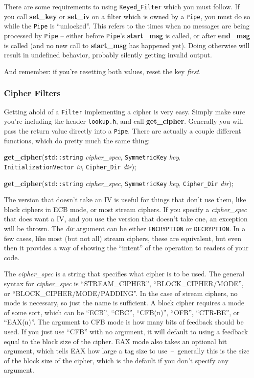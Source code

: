 \documentclass{article}
\newcommand{\filename}[1]{\texttt{#1}}
\newcommand{\function}[1]{\textbf{#1}}
\newcommand{\type}[1]{\texttt{#1}}
\renewcommand{\arg}[1]{\textsl{#1}}
\begin{document}
There are some requirements to using \type{Keyed\_Filter} which you must
follow. If you call \function{set\_key} or \function{set\_iv} on a filter which
is owned by a \type{Pipe}, you must do so while the \type{Pipe} is
``unlocked''. This refers to the times when no messages are being processed by
\type{Pipe} -- either before \type{Pipe}'s \function{start\_msg} is called, or
after \function{end\_msg} is called (and no new call to \function{start\_msg}
has happened yet). Doing otherwise will result in undefined behavior, probably
silently getting invalid output.

And remember: if you're resetting both values, reset the key \emph{first}.

\subsubsection{Cipher Filters}

Getting ahold of a \type{Filter} implementing a cipher is very easy. Simply
make sure you're including the header \filename{lookup.h}, and call
\function{get\_cipher}. Generally you will pass the return value directly into
a \type{Pipe}. There are actually a couple different functions, which do pretty
much the same thing:

\function{get\_cipher}(\type{std::string} \arg{cipher\_spec},
                       \type{SymmetricKey} \arg{key},
                       \type{InitializationVector} \arg{iv},
                       \type{Cipher\_Dir} \arg{dir});

\function{get\_cipher}(\type{std::string} \arg{cipher\_spec},
                       \type{SymmetricKey} \arg{key},
                       \type{Cipher\_Dir} \arg{dir});

The version that doesn't take an IV is useful for things that don't use them,
like block ciphers in ECB mode, or most stream ciphers. If you specify a
\arg{cipher\_spec} that does want a IV, and you use the version that doesn't
take one, an exception will be thrown. The \arg{dir} argument can be either
\type{ENCRYPTION} or \type{DECRYPTION}. In a few cases, like most (but not all)
stream ciphers, these are equivalent, but even then it provides a way of
showing the ``intent'' of the operation to readers of your code.

The \arg{cipher\_spec} is a string that specifies what cipher is to be
used. The general syntax for \arg{cipher\_spec} is ``STREAM\_CIPHER'',
``BLOCK\_CIPHER/MODE'', or ``BLOCK\_CIPHER/MODE/PADDING''. In the case of
stream ciphers, no mode is necessary, so just the name is sufficient. A block
cipher requires a mode of some sort, which can be ``ECB'', ``CBC'', ``CFB(n)'',
``OFB'', ``CTR-BE'', or ``EAX(n)''. The argument to CFB mode is how many bits
of feedback should be used. If you just use ``CFB'' with no argument, it will
default to using a feedback equal to the block size of the cipher. EAX mode
also takes an optional bit argument, which tells EAX how large a tag size to
use~--~generally this is the size of the block size of the cipher, which is the
default if you don't specify any argument.
\end{document}
